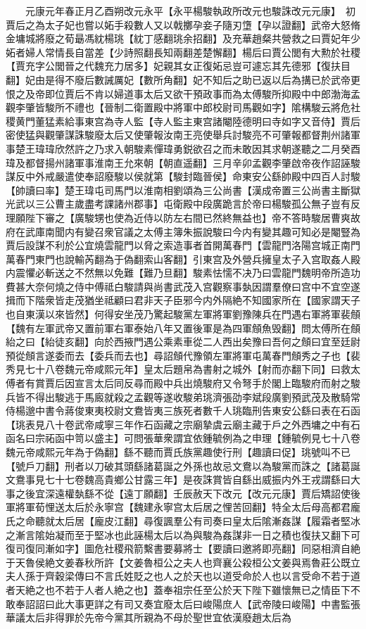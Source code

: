 　　元康元年春正月乙酉朔改元永平【永平楊駿執政所改元也駿誅改元元康】　初賈后之為太子妃也嘗以妬手殺數人又以戟擲孕妾子隨刃墯【孕以證翻】武帝大怒脩金墉城將廢之荀朂馮紞楊珧【紞丁感翻珧余招翻】及充華趙粲共營救之曰賈妃年少妬者婦人常情長自當差【少詩照翻長知兩翻差楚懈翻】楊后曰賈公閭有大勲於社稷【賈充字公閭晉之代魏充力居多】妃親其女正復妬忌豈可遽忘其先德邪【復扶目翻】妃由是得不廢后數誡厲妃【數所角翻】妃不知后之助已返以后為搆已於武帝更恨之及帝即位賈后不肯以婦道事太后又欲干預政事而為太傅駿所抑殿中中郎渤海孟觀李肇皆駿所不禮也【晉制二衛置殿中將軍中郎校尉司馬觀如字】隂構駿云將危社稷黄門董猛素給事東宫為寺人監【寺人監主東宫諸閹陸德明曰寺如字又音侍】賈后密使猛與觀肇謀誅駿廢太后又使肇報汝南王亮使舉兵討駿亮不可肇報都督荆州諸軍事楚王瑋瑋欣然許之乃求入朝駿素憚瑋勇鋭欲召之而未敢因其求朝遂聽之二月癸酉瑋及都督揚州諸軍事淮南王允來朝【朝直遥翻】三月辛卯孟觀李肇啟帝夜作詔誣駿謀反中外戒嚴遣使奉詔廢駿以侯就第【駿封臨晉侯】命東安公繇帥殿中四百人討駿【帥讀曰率】楚王瑋屯司馬門以淮南相劉頌為三公尚書【漢成帝置三公尚書主斷獄光武以三公曹主歲盡考課諸州郡事】屯衛殿中段廣跪言於帝曰楊駿孤公無子豈有反理願陛下審之【廣駿甥也使為近侍以防左右間已然終無益也】帝不答時駿居曹爽故府在武庫南聞内有變召衆官議之太傅主簿朱振說駿曰今内有變其趣可知必是閹豎為賈后設謀不利於公宜燒雲龍門以脅之索造事者首開萬春門【雲龍門洛陽宫城正南門萬春門東門也說輸芮翻為于偽翻索山客翻】引東宫及外營兵擁皇太子入宫取姦人殿内震懼必斬送之不然無以免難【難乃旦翻】駿素怯懦不决乃曰雲龍門魏明帝所造功費甚大奈何燒之侍中傅祗白駿請與尚書武茂入宫觀察事埶因謂羣僚曰宫中不宜空遂揖而下階衆皆走茂猶坐祗顧曰君非天子臣邪今内外隔絶不知國家所在【國家謂天子也自東漢以來皆然】何得安坐茂乃驚起駿黨左軍將軍劉豫陳兵在門遇右軍將軍裴頠【魏有左軍武帝又置前軍右軍泰始八年又置後軍是為四軍頠魚毁翻】問太傅所在頠紿之曰【紿徒亥翻】向於西掖門遇公乘素車從二人西出矣豫曰吾何之頠曰宜至廷尉預從頠言遂委而去【委兵而去也】尋詔頠代豫領左軍將軍屯萬春門頠秀之子也【裴秀見七十八卷魏元帝咸熙元年】皇太后題帛為書射之城外【射而亦翻下同】曰救太傅者有賞賈后因宣言太后同反尋而殿中兵出燒駿府又令弩手於閣上臨駿府而射之駿兵皆不得出駿逃于馬廄就殺之孟觀等遂收駿弟珧濟張劭李斌段廣劉預武茂及散騎常侍楊邈中書令蔣俊東夷校尉文鴦皆夷三族死者數千人珧臨刑告東安公繇曰表在石函【珧表見八十卷武帝咸寧三年作石函藏之宗廟摯虞云廟主藏于戶之外西墉之中有石函名曰宗祏函中笥以盛主】可問張華衆謂宜依鍾毓例為之申理【鍾毓例見七十八卷魏元帝咸熙元年為于偽翻】繇不聽而賈氏族黨趣使行刑【趣讀曰促】珧號叫不已【號戶刀翻】刑者以刀破其頭繇諸葛誕之外孫也故忌文鴦以為駿黨而誅之【諸葛誕文鴦事見七十七卷魏高貴鄉公甘露三年】是夜誅賞皆自繇出威振内外王戎謂繇曰大事之後宜深遠權埶繇不從【遠丁願翻】壬辰赦天下改元【改元元康】賈后矯詔使後軍將軍荀悝送太后於永寧宫【魏建永寧宫太后居之悝苦回翻】特全太后母高都君龐氏之命聽就太后居【龐皮江翻】尋復諷羣公有司奏曰皇太后隂漸姦謀【履霜者堅冰之漸言隂始凝而至于堅冰也此誣楊太后以為與駿為姦謀非一日之積也復扶又翻下可復司復同漸如字】圖危社稷飛箭繫書要募將士【要讀曰邀將即亮翻】同惡相濟自絶于天魯侯絶文姜春秋所許【文姜魯桓公之夫人也齊襄公殺桓公文姜與焉魯莊公既立夫人孫于齊穀梁傳曰不言氏姓貶之也人之於天也以道受命於人也以言受命不若于道者天絶之也不若于人者人絶之也】蓋奉祖宗任至公於天下陛下雖懷無已之情臣下不敢奉詔詔曰此大事更詳之有司又奏宜廢太后曰峻陽庶人【武帝陵曰峻陽】中書監張華議太后非得罪於先帝今黨其所親為不母於聖世宜依漢廢趙太后為